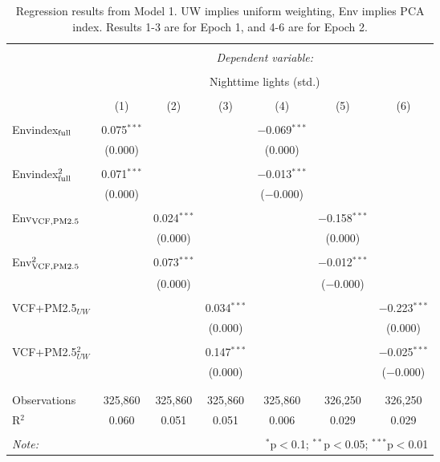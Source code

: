 
\begin{table}[H] \centering 
  \caption{Regression results from Model 1. UW implies uniform weighting, Env implies PCA index. Results 1-3 are for Epoch 1, and 4-6 are for Epoch 2.} 
  \label{tab:mod1} 
\begin{tabular}{@{\extracolsep{5pt}}lcccccc} 
\\[-1.8ex]\hline 
\hline \\[-1.8ex] 
 & \multicolumn{6}{c}{\textit{Dependent variable:}} \\ 
\cline{2-7} 
\\[-1.8ex] & \multicolumn{6}{c}{Nighttime lights (std.)} \\ 
\\[-1.8ex] & (1) & (2) & (3) & (4) & (5) & (6)\\ 
\hline \\[-1.8ex] 
Envindex$_{\rm{full}}$ & 0.075$^{***}$ &  &  & $-$0.069$^{***}$ &  &  \\ 
  & (0.000) &  &  & (0.000) &  &  \\ 
  & & & & & & \\ 
  Envindex$_{\rm{full}}^2$ & 0.071$^{***}$ &  &  & $-$0.013$^{***}$ &  &  \\ 
  & (0.000) &  &  & ($-$0.000) &  &  \\ 
  & & & & & & \\ 
  Env$_{\rm{VCF,PM2.5}}$ &  & 0.024$^{***}$ &  &  & $-$0.158$^{***}$ &  \\ 
  &  & (0.000) &  &  & (0.000) &  \\ 
  & & & & & & \\ 
  Env$_{\rm{VCF,PM2.5}}^2$ &  & 0.073$^{***}$ &  &  & $-$0.012$^{***}$ &  \\ 
  &  & (0.000) &  &  & ($-$0.000) &  \\ 
  & & & & & & \\ 
  VCF+PM2.5$_{UW}$ &  &  & 0.034$^{***}$ &  &  & $-$0.223$^{***}$ \\ 
  &  &  & (0.000) &  &  & (0.000) \\ 
  & & & & & & \\ 
  VCF+PM2.5$_{UW}^2$ &  &  & 0.147$^{***}$ &  &  & $-$0.025$^{***}$ \\ 
  &  &  & (0.000) &  &  & ($-$0.000) \\ 
  & & & & & & \\ 
\hline \\[-1.8ex] 
Observations & 325,860 & 325,860 & 325,860 & 325,860 & 326,250 & 326,250 \\ 
R$^{2}$ & 0.060 & 0.051 & 0.051 & 0.006 & 0.029 & 0.029 \\ 
\hline 
\hline \\[-1.8ex] 
\textit{Note:}  & \multicolumn{6}{r}{$^{*}$p$<$0.1; $^{**}$p$<$0.05; $^{***}$p$<$0.01} \\ 
\end{tabular} 
\end{table} 
